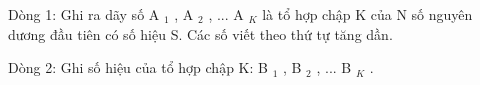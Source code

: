 Dòng 1: Ghi ra dãy số A $_ 1 $ , A $_ 2 $ , ... A $_ K $ là tổ hợp chập K của N số nguyên dương đầu tiên có số hiệu S. Các số viết theo thứ tự tăng dần.

Dòng 2: Ghi số hiệu của tổ hợp chập K: B $_ 1 $ , B $_ 2 $ , ... B $_ K $ .

\